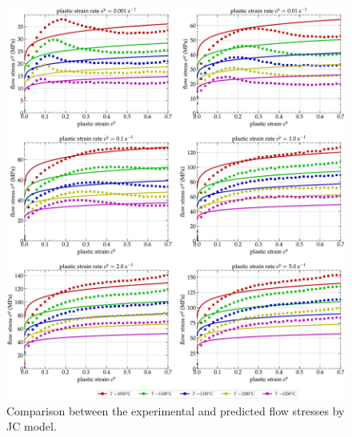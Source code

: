 \documentclass[twoside,english,1p,final,sort&compress]{elsarticle}
\theoremstyle{plain}
\begin{document}
\begin{figure}[!ht]
\centering
\includegraphics[width=1.02\columnwidth]{Figures/CompExpJC}
\caption{Comparison between the experimental and predicted flow stresses by JC model.}
\label{fig:iCorrelationJC}
\end{figure}

\end{document}
